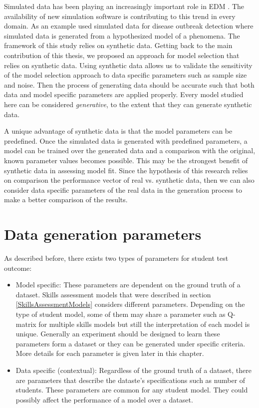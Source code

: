 \label{sec:Syn}


Simulated data has been playing an increasingly important role in EDM \citep{JEDM:baker2009}. The availability of new simulation software is contributing to this trend in every domain. As an example \citet{jafarpour2015quantifying} used simulated data for disease outbreak detection where simulated data is generated from a hypothesized model of a phenomena. The framework of this study relies on synthetic data. Getting back to the main contribution of this thesis, we proposed an approach for model selection that relies on synthetic data. Using synthetic data allows us to validate the sensitivity of the model selection approach to data specific parameters such as sample size and noise. Then the process of generating data should be accurate such that both data  and model specific parameters are applied properly. Every model studied here can be considered \textit{generative}, to the extent that they can generate synthetic data.

A unique advantage of synthetic data is that the model parameters can be predefined. Once the simulated data is generated with predefined parameters, a model can be trained over the generated data and a comparison with the original, known parameter values becomes possible. This may be the strongest benefit of synthetic data in assessing model fit. Since the hypothesis of this research relies on comparison the performance vector of real vs. synthetic data, then we can also consider data specific parameters of the real data in the generation process to make a better comparison of the results.

\section{Data generation parameters}
As described before, there exists two types of parameters for student test outcome:
\begin{itemize}
\item Model specific: These parameters are dependent on the ground truth of a dataset. Skills assessment models that were described in section \ref{SkillsAssessmentModels} considers different parameters. Depending on the type of student model, some of them may share a parameter such as Q-matrix for multiple skills models but still the interpretation of each model is unique. Generally an experiment should be designed to learn these parameters form a dataset or they can be generated under specific criteria. More details for each parameter is given later in this chapter.
\item Data specific (contextual): Regardless of the ground truth of a dataset, there are parameters that describe the dataste's specifications such as number of students. These parameters are common for any student model. They could possibly affect the performance of a model over a dataset. 
\end{itemize}


